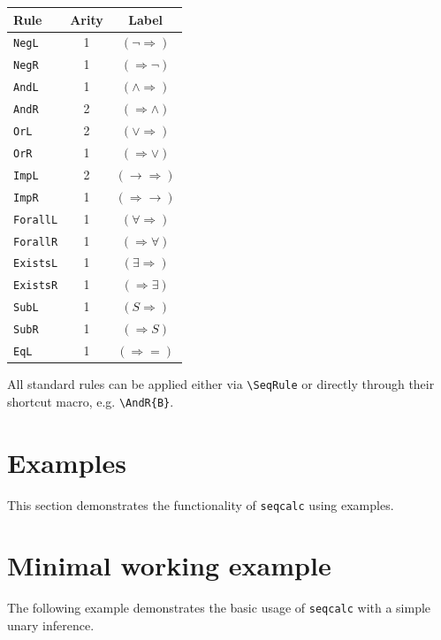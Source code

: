 \documentclass[a4paper,1pt]{article}
\begin{document}
\begin{center}
    \begin{tabular}{lcc}
        \toprule
        \textbf{Rule} & \textbf{Arity} & \textbf{Label} \\
        \midrule
        \texttt{NegL} & 1 & $(\neg\Rightarrow)$ \\
        \texttt{NegR} & 1 & $(\Rightarrow\neg)$ \\
        \texttt{AndL} & 1 & $(\land\Rightarrow)$ \\
        \texttt{AndR} & 2 & $(\Rightarrow\land)$ \\
        \texttt{OrL} & 2 & $(\lor\Rightarrow)$ \\
        \texttt{OrR} & 1 & $(\Rightarrow\lor)$ \\
        \texttt{ImpL} & 2 & $(\to\Rightarrow)$ \\
        \texttt{ImpR} & 1 & $(\Rightarrow\to)$ \\
        \texttt{ForallL} & 1 & $(\forall\Rightarrow)$ \\
        \texttt{ForallR} & 1 & $(\Rightarrow\forall)$ \\
        \texttt{ExistsL} & 1 & $(\exists\Rightarrow)$ \\
        \texttt{ExistsR} & 1 & $(\Rightarrow\exists)$ \\
        \texttt{SubL} & 1 & $(S\Rightarrow)$ \\
        \texttt{SubR} & 1 & $(\Rightarrow S)$ \\
        \texttt{EqL} & 1 & $(\Rightarrow =)$ \\
        \bottomrule
    \end{tabular}
\end{center}
All standard rules can be applied either via \texttt{\textbackslash SeqRule} or directly through their shortcut macro, e.g.
\texttt{\textbackslash AndR\{B\}}.


\section{Examples}
\label{sec:examples}

This section demonstrates the functionality of \texttt{seqcalc} using examples.

\section{Minimal working example}
The following example demonstrates the basic usage of \texttt{seqcalc}
with a simple unary inference.
\end{document}
